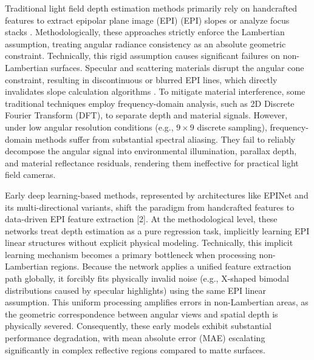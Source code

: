 Traditional light field depth estimation methods primarily rely on handcrafted features to extract epipolar plane image (EPI) (EPI) slopes or analyze focus stacks . Methodologically, these approaches strictly enforce the Lambertian assumption, treating angular radiance consistency as an absolute geometric constraint. Technically, this rigid assumption causes significant failures on non-Lambertian surfaces. Specular and scattering materials disrupt the angular cone constraint, resulting in discontinuous or blurred EPI lines, which directly invalidates slope calculation algorithms . To mitigate material interference, some traditional techniques employ frequency-domain analysis, such as 2D Discrete Fourier Transform (DFT), to separate depth and material signals. However, under low angular resolution conditions (e.g., $9 \times 9$ discrete sampling), frequency-domain methods suffer from substantial spectral aliasing. They fail to reliably decompose the angular signal into environmental illumination, parallax depth, and material reflectance residuals, rendering them ineffective for practical light field cameras.

Early deep learning-based methods, represented by architectures like EPINet and its multi-directional variants, shift the paradigm from handcrafted features to data-driven EPI feature extraction [2]. At the methodological level, these networks treat depth estimation as a pure regression task, implicitly learning EPI linear structures without explicit physical modeling. Technically, this implicit learning mechanism becomes a primary bottleneck when processing non-Lambertian regions. Because the network applies a unified feature extraction path globally, it forcibly fits physically invalid noise (e.g., X-shaped bimodal distributions caused by specular highlights) using the same EPI linear assumption. This uniform processing amplifies errors in non-Lambertian areas, as the geometric correspondence between angular views and spatial depth is physically severed. Consequently, these early models exhibit substantial performance degradation, with mean absolute error (MAE) escalating significantly in complex reflective regions compared to matte surfaces.

